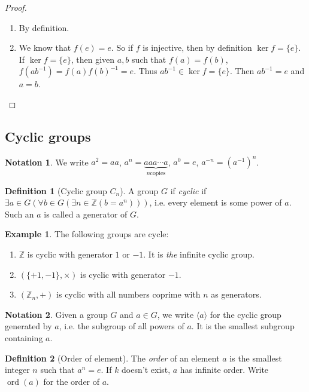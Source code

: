 \documentclass[a4paper]{article}
\theoremstyle{definition}
\newtheorem*{defi}{Definition}
\newtheorem*{eg}{Example}
\newtheorem*{notation}{Notation}
\newcommand{\Z}{\mathbb{Z}}
\newcommand{\bra}{\langle}
\newcommand{\ket}{\rangle}
\DeclareMathOperator\ord{ord}
\begin{document}
\begin{proof}\leavevmode
  \begin{enumerate}
  \item By definition.
  \item We know that $f(e) = e$. So if $f$ is injective, then by definition $\ker f = \{e\}$. If $\ker f = \{e\}$, then given $a, b$ such that $f(a) = f(b)$, $f(ab^{-1}) = f(a)f(b)^{-1} = e$. Thus $ab^{-1}\in \ker f = \{e\}$.  Then $ab^{-1} = e$ and $a = b$.
  \end{enumerate}
\end{proof}

\subsection{Cyclic groups}
\begin{notation}
  We write $a^2 = aa$, $a^n = \underbrace{aaa\cdots a}_{n \text{copies}}$, $a^0 = e$, $a^{-n} = (a^{-1})^n$.
\end{notation}

\begin{defi}[Cyclic group $C_n$]
  A group $G$ if \emph{cyclic} if $\exists a\in G(\forall b\in G(\exists n\in\Z(b=a^n)))$, i.e. every element is some power of $a$. Such an $a$ is called a generator of $G$.
\end{defi}

\begin{eg}
  The following groups are cycle:
  \begin{enumerate}
  \item $\Z$ is cyclic with generator $1$ or $-1$. It is \emph{the} infinite cyclic group.
  \item $(\{+1, -1\}, \times)$ is cyclic with generator $-1$.
  \item $(\Z_n, +)$ is cyclic with all numbers coprime with $n$ as generators.
  \end{enumerate}
\end{eg}

\begin{notation}
  Given a group $G$ and $a\in G$, we write $\bra a\ket$ for the cyclic group generated by $a$, i.e. the subgroup of all powers of $a$. It is the smallest subgroup containing $a$.
\end{notation}

\begin{defi}[Order of element]
  The \emph{order} of an element $a$ is the smallest integer $n$ such that $a^n = e$. If $k$ doesn't exist, $a$ has infinite order. Write $\ord(a)$ for the order of $a$.
\end{defi}
\end{document}
